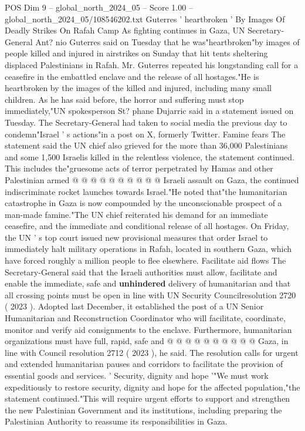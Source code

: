 \begin{textsample}{POS Dim 9 – global\_north\_2024\_05 – Score 1.00 – global\_north\_2024\_05/108546202.txt}  \label{ex:f9_pos_298}
Guterres ' heartbroken ' By Images Of Deadly Strikes On Rafah Camp As fighting continues in Gaza, UN Secretary-General Ant? nio Guterres said on Tuesday that he was"heartbroken"by images of people killed and injured in airstrikes on Sunday that hit tents sheltering displaced Palestinians in Rafah.
Mr.
Guterres repeated his longstanding call for a ceasefire in the embattled enclave and the release of all hostages."He is heartbroken by the images of the killed and injured, including many small children.
As he has said before, the horror and suffering must stop immediately,"UN spokesperson St? phane Dujarric said in a statement issued on Tuesday.
The Secretary-General had taken to social media the previous day to condemn"Israel ' s actions"in a post on X, formerly Twitter.
Famine fears The statement said the UN chief also grieved for the more than 36,000 Palestinians and some 1,500 Israelis killed in the relentless violence, the statement continued.
This includes the"gruesome acts of terror perpetrated by Hamas and other Palestinian armed @ @ @ @ @ @ @ @ @ @ Israeli assault on Gaza, the continued indiscriminate rocket launches towards Israel."He noted that"the humanitarian catastrophe in Gaza is now compounded by the unconscionable prospect of a man-made famine."The UN chief reiterated his demand for an immediate ceasefire, and the immediate and conditional release of all hostages.
On Friday, the UN ' s top court issued new provisional measures that order Israel to immediately halt military operations in Rafah, located in southern Gaza, which have forced roughly a million people to flee elsewhere.
Facilitate aid flows The Secretary-General said that the Israeli authorities must allow, facilitate and enable the immediate, safe and \textbf{unhindered} delivery of humanitarian and that all crossing points must be open in line with UN Security Councilresolution 2720 ( 2023 ).
Adopted last December, it established the post of a UN Senior Humanitarian and Reconstruction Coordinator who will facilitate, coordinate, monitor and verify aid consignments to the enclave.
Furthermore, humanitarian organizations must have full, rapid, safe and @ @ @ @ @ @ @ @ @ @ Gaza, in line with Council resolution 2712 ( 2023 ), he said.
The resolution calls for urgent and extended humanitarian pauses and corridors to facilitate the provision of essential goods and services. ' Security, dignity and hope '"We must work expeditiously to restore security, dignity and hope for the affected population,"the statement continued."This will require urgent efforts to support and strengthen the new Palestinian Government and its institutions, including preparing the Palestinian Authority to reassume its responsibilities in Gaza.

\end{textsample}
